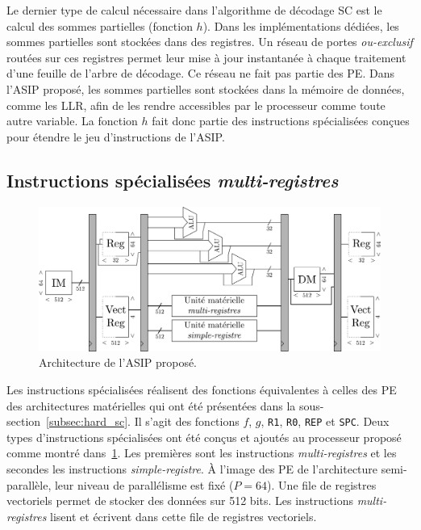 Le dernier type de calcul nécessaire dans l'algorithme de décodage SC est le calcul des sommes partielles (fonction $h$). Dans les implémentations dédiées, les sommes partielles sont stockées dans des registres. Un réseau de portes \textit{ou-exclusif} routées sur ces registres permet leur mise à jour instantanée à chaque traitement d'une feuille de l'arbre de décodage. Ce réseau ne fait pas partie des PE. Dans l'ASIP proposé, les sommes partielles sont stockées dans la mémoire de données, comme les LLR, afin de les rendre accessibles par le processeur comme toute autre variable. La fonction $h$ fait donc partie des instructions spécialisées conçues pour étendre le jeu d'instructions de l'ASIP.

\subsection{Instructions spécialisées \textit{multi-registres}}
\label{subsec:multi_reg}

\begin{figure}
\centering
\includegraphics[width=\textwidth]{main/ch3_fig/full_tensilica}
\caption{Architecture de l'ASIP proposé.}
\label{fig:full_tensilica}
\end{figure}

Les instructions spécialisées réalisent des fonctions équivalentes à celles des PE des architectures matérielles qui ont été présentées dans la sous-section~\ref{subsec:hard_sc}. Il s'agit des fonctions $f$, $g$, \texttt{R1}, \texttt{R0}, \texttt{REP} et \texttt{SPC}. Deux types d'instructions spécialisées ont été conçus et ajoutés au processeur proposé comme montré dans~\ref{fig:full_tensilica}. Les premières sont les instructions \textit{multi-registres} et les secondes les instructions \textit{simple-registre}. \`A l'image des PE de l'architecture semi-parallèle, leur niveau de parallélisme est fixé ($P=64$). Une file de registres vectoriels permet de stocker des données sur 512 bits. Les instructions \textit{multi-registres} lisent et écrivent dans cette file de registres vectoriels.

